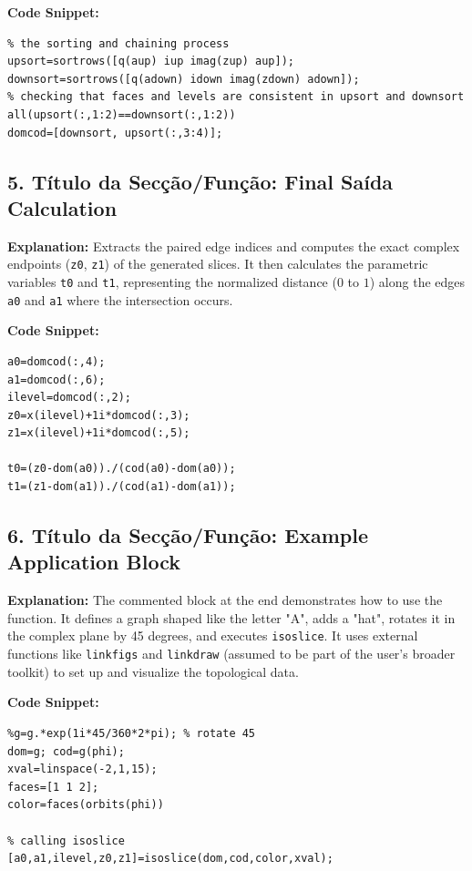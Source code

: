 \textbf{Code Snippet:}
\begin{lstlisting}
% the sorting and chaining process
upsort=sortrows([q(aup) iup imag(zup) aup]);
downsort=sortrows([q(adown) idown imag(zdown) adown]);
% checking that faces and levels are consistent in upsort and downsort
all(upsort(:,1:2)==downsort(:,1:2))
domcod=[downsort, upsort(:,3:4)];
\end{lstlisting}

\subsection*{5. Título da Secção/Função: Final Saída Calculation}
\textbf{Explanation:} Extracts the paired edge indices and computes the exact complex endpoints (\texttt{z0}, \texttt{z1}) of the generated slices. It then calculates the parametric variables \texttt{t0} and \texttt{t1}, representing the normalized distance ($0$ to $1$) along the edges \texttt{a0} and \texttt{a1} where the intersection occurs.

\textbf{Code Snippet:}
\begin{lstlisting}
a0=domcod(:,4);
a1=domcod(:,6);
ilevel=domcod(:,2);
z0=x(ilevel)+1i*domcod(:,3);
z1=x(ilevel)+1i*domcod(:,5);

t0=(z0-dom(a0))./(cod(a0)-dom(a0));
t1=(z1-dom(a1))./(cod(a1)-dom(a1));
\end{lstlisting}

\subsection*{6. Título da Secção/Função: Example Application Block}
\textbf{Explanation:} The commented block at the end demonstrates how to use the function. It defines a graph shaped like the letter "A", adds a "hat", rotates it in the complex plane by 45 degrees, and executes \texttt{isoslice}. It uses external functions like \texttt{linkfigs} and \texttt{linkdraw} (assumed to be part of the user's broader toolkit) to set up and visualize the topological data.

\textbf{Code Snippet:}
\begin{lstlisting}
%g=g.*exp(1i*45/360*2*pi); % rotate 45
dom=g; cod=g(phi);
xval=linspace(-2,1,15);
faces=[1 1 2];
color=faces(orbits(phi))

% calling isoslice
[a0,a1,ilevel,z0,z1]=isoslice(dom,cod,color,xval);
\end{lstlisting}

